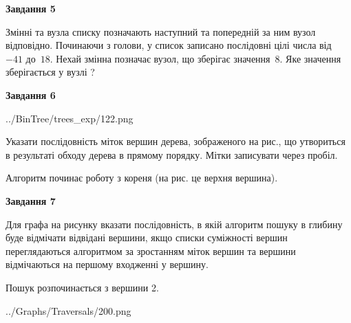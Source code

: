 \documentclass[12pt, ukrainian]{article}
\begin{document}
{\begin {large}
{\begin {center}\textbf{Завдання 5}\end {center}}\par
Змінні  та  вузла списку позначають наступний та попередній за ним вузол відповідно. Починаючи з голови, у список записано послідовні цілі числа від~$-41$ до~$18$. Нехай змінна  позначає вузол, що зберігає значення~$8$.
Яке значення зберігається у вузлі  ?\par
\newpage

{\begin {center}\textbf{Завдання 6}\end {center}}\par

\begin{center}
	{../BinTree/trees_exp/122.png}
\end{center}
Указати послідовність міток вершин дерева, зображеного на рис., що утвориться в результаті обходу дерева в прямому порядку. Мітки записувати через пробіл.\par Алгоритм починає роботу з кореня (на рис. це верхня вершина).\par
\newpage

{\begin {center}\textbf{Завдання 7}\end {center}}\par
Для графа на рисунку вказати послідовність, в якій алгоритм пошуку в глибину буде відмічати відвідані вершини, якщо списки суміжності вершин переглядаються алгоритмом за зростанням міток вершин та вершини відмічаються на першому вход\-женні у вершину.\par
Пошук розпочинається з вершини 2.\par

\begin{center}
	{../Graphs/Traversals/200.png}
\end{center}\par
\newpage


\end{large}}
\end{document}
